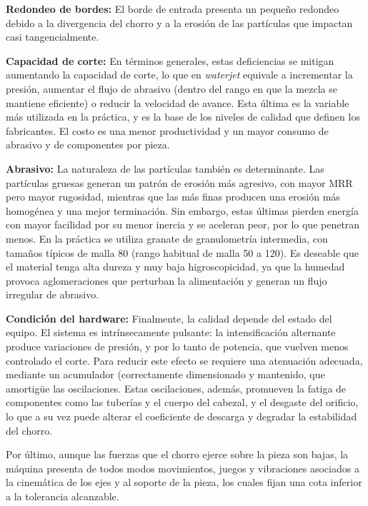 \textbf{Redondeo de bordes:} El borde de entrada presenta un pequeño redondeo debido a la divergencia del chorro y a la erosión de las partículas que impactan casi tangencialmente. 

\textbf{Capacidad de corte:} En términos generales, estas deficiencias se mitigan aumentando la capacidad de corte, lo que en \textit{waterjet} equivale a incrementar la presión, aumentar el flujo de abrasivo (dentro del rango en que la mezcla se mantiene eficiente) o reducir la velocidad de avance. Esta última es la variable más utilizada en la práctica, y es la base de los niveles de calidad que definen los fabricantes. El costo es una menor productividad y un mayor consumo de abrasivo y de componentes por pieza.

\textbf{Abrasivo:} La naturaleza de las partículas también es determinante. Las partículas gruesas generan un patrón de erosión más agresivo, con mayor MRR pero mayor rugosidad, mientras que las más finas producen una erosión más homogénea y una mejor terminación. Sin embargo, estas últimas pierden energía con mayor facilidad por su menor inercia y se aceleran peor, por lo que penetran menos. En la práctica se utiliza granate de granulometría intermedia, con tamaños típicos de malla 80 (rango habitual de malla 50 a 120). Es deseable que el material tenga alta dureza y muy baja higroscopicidad, ya que la humedad provoca aglomeraciones que perturban la alimentación y generan un flujo irregular de abrasivo.

\textbf{Condición del hardware:} Finalmente, la calidad depende del estado del equipo. El sistema es intrínsecamente pulsante: la intensificación alternante produce variaciones de presión, y por lo tanto de potencia, que vuelven menos controlado el corte. Para reducir este efecto se requiere una atenuación adecuada, mediante un acumulador (correctamente dimensionado y mantenido, que amortigüe las oscilaciones. Estas oscilaciones, además, promueven la fatiga de componentes como las tuberías y el cuerpo del cabezal, y el desgaste del orificio, lo que a su vez puede alterar el coeficiente de descarga y degradar la estabilidad del chorro.

Por último, aunque las fuerzas que el chorro ejerce sobre la pieza son bajas, la máquina presenta de todos modos movimientos, juegos y vibraciones asociados a la cinemática de los ejes y al soporte de la pieza, los cuales fijan una cota inferior a la tolerancia alcanzable.

